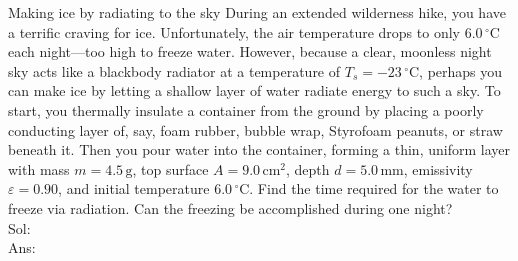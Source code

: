 \begin{practicebox}{Making ice by radiating to the sky}
During an extended wilderness hike, you have a terrific craving
for ice. Unfortunately, the air temperature drops to only
$6.0\,^\circ\mathrm{C}$ each night—too high to freeze water.
However, because a clear, moonless night sky acts like a blackbody
radiator at a temperature of $T_s = -23\,^\circ\mathrm{C}$,
perhaps you can make ice by letting a shallow layer of water radiate
energy to such a sky. To start, you thermally insulate a container
from the ground by placing a poorly conducting layer of, say,
foam rubber, bubble wrap, Styrofoam peanuts, or straw beneath it.
Then you pour water into the container, forming a thin, uniform
layer with mass $m = 4.5\,\mathrm{g}$, top surface $A = 9.0\,\mathrm{cm^2}$,
depth $d = 5.0\,\mathrm{mm}$, emissivity $\varepsilon = 0.90$,
and initial temperature $6.0\,^\circ\mathrm{C}$. Find the time
required for the water to freeze via radiation. Can the freezing
be accomplished during one night? \\
%
Sol: \\
Ans:
\end{practicebox}